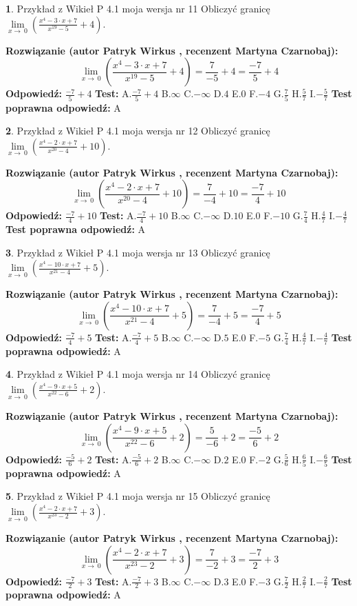 \documentclass[12pt, a4paper]{article}
\theoremstyle{definition} %
\newtheorem{zad}{}
\newcommand{\zadStart}[1]{\begin{zad}#1\newline}
\newcommand{\zadStop}{\end{zad}}
\newcommand{\rozwStart}[2]{\noindent \textbf{Rozwiązanie (autor #1 , recenzent #2): }\newline}
\newcommand{\rozwStop}{\newline}
\newcommand{\odpStart}{\noindent \textbf{Odpowiedź:}\newline}
\newcommand{\odpStop}{\newline}
\newcommand{\testStart}{\noindent \textbf{Test:}\newline}
\newcommand{\testStop}{\newline}
\newcommand{\kluczStart}{\noindent \textbf{Test poprawna odpowiedź:}\newline}
\newcommand{\kluczStop}{\newline}
\begin{document}
\zadStart{Przykład z Wikieł P 4.1 moja wersja nr 11}
Obliczyć granicę $\lim\limits_{x\to\ 0}(\frac{x^{4}-3 \cdot x +7}{x^{19}-5}+4)$.
\zadStop
\rozwStart{Patryk Wirkus}{Martyna Czarnobaj}
$$\lim\limits_{x\to\ 0}(\frac{x^{4}-3 \cdot x +7}{x^{19}-5}+4)=\frac{7}{-5}+4=\frac{-7}{5}+4$$
\rozwStop
\odpStart
$\frac{-7}{5}+4$
\odpStop
\testStart
A.$\frac{-7}{5}+4$
B.$\infty$
C.$-\infty$
D.$4$
E.$0$
F.$-4$
G.$\frac{7}{5}$
H.$\frac{5}{7}$
I.$-\frac{5}{7}$
\testStop
\kluczStart
A
\kluczStop



\zadStart{Przykład z Wikieł P 4.1 moja wersja nr 12}
Obliczyć granicę $\lim\limits_{x\to\ 0}(\frac{x^{4}-2 \cdot x +7}{x^{20}-4}+10)$.
\zadStop
\rozwStart{Patryk Wirkus}{Martyna Czarnobaj}
$$\lim\limits_{x\to\ 0}(\frac{x^{4}-2 \cdot x +7}{x^{20}-4}+10)=\frac{7}{-4}+10=\frac{-7}{4}+10$$
\rozwStop
\odpStart
$\frac{-7}{4}+10$
\odpStop
\testStart
A.$\frac{-7}{4}+10$
B.$\infty$
C.$-\infty$
D.$10$
E.$0$
F.$-10$
G.$\frac{7}{4}$
H.$\frac{4}{7}$
I.$-\frac{4}{7}$
\testStop
\kluczStart
A
\kluczStop



\zadStart{Przykład z Wikieł P 4.1 moja wersja nr 13}
Obliczyć granicę $\lim\limits_{x\to\ 0}(\frac{x^{4}-10 \cdot x +7}{x^{21}-4}+5)$.
\zadStop
\rozwStart{Patryk Wirkus}{Martyna Czarnobaj}
$$\lim\limits_{x\to\ 0}(\frac{x^{4}-10 \cdot x +7}{x^{21}-4}+5)=\frac{7}{-4}+5=\frac{-7}{4}+5$$
\rozwStop
\odpStart
$\frac{-7}{4}+5$
\odpStop
\testStart
A.$\frac{-7}{4}+5$
B.$\infty$
C.$-\infty$
D.$5$
E.$0$
F.$-5$
G.$\frac{7}{4}$
H.$\frac{4}{7}$
I.$-\frac{4}{7}$
\testStop
\kluczStart
A
\kluczStop



\zadStart{Przykład z Wikieł P 4.1 moja wersja nr 14}
Obliczyć granicę $\lim\limits_{x\to\ 0}(\frac{x^{4}-9 \cdot x +5}{x^{22}-6}+2)$.
\zadStop
\rozwStart{Patryk Wirkus}{Martyna Czarnobaj}
$$\lim\limits_{x\to\ 0}(\frac{x^{4}-9 \cdot x +5}{x^{22}-6}+2)=\frac{5}{-6}+2=\frac{-5}{6}+2$$
\rozwStop
\odpStart
$\frac{-5}{6}+2$
\odpStop
\testStart
A.$\frac{-5}{6}+2$
B.$\infty$
C.$-\infty$
D.$2$
E.$0$
F.$-2$
G.$\frac{5}{6}$
H.$\frac{6}{5}$
I.$-\frac{6}{5}$
\testStop
\kluczStart
A
\kluczStop



\zadStart{Przykład z Wikieł P 4.1 moja wersja nr 15}
Obliczyć granicę $\lim\limits_{x\to\ 0}(\frac{x^{4}-2 \cdot x +7}{x^{23}-2}+3)$.
\zadStop
\rozwStart{Patryk Wirkus}{Martyna Czarnobaj}
$$\lim\limits_{x\to\ 0}(\frac{x^{4}-2 \cdot x +7}{x^{23}-2}+3)=\frac{7}{-2}+3=\frac{-7}{2}+3$$
\rozwStop
\odpStart
$\frac{-7}{2}+3$
\odpStop
\testStart
A.$\frac{-7}{2}+3$
B.$\infty$
C.$-\infty$
D.$3$
E.$0$
F.$-3$
G.$\frac{7}{2}$
H.$\frac{2}{7}$
I.$-\frac{2}{7}$
\testStop
\kluczStart
A
\kluczStop
\end{document}
